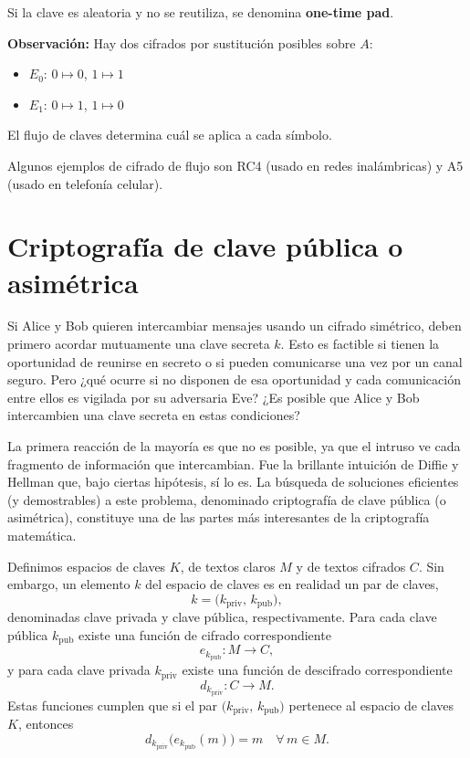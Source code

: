 Si la clave es aleatoria y no se reutiliza, se denomina \textbf{one-time pad}.

\textbf{Observación:} Hay dos cifrados por sustitución posibles sobre $A$:
\begin{itemize}
    \item $E_0$: $0 \mapsto 0$, $1 \mapsto 1$
    \item $E_1$: $0 \mapsto 1$, $1 \mapsto 0$
\end{itemize}

El flujo de claves determina cuál se aplica a cada símbolo.

Algunos ejemplos de cifrado de flujo son RC4 (usado en redes inalámbricas)\cite{rfc6229,gfg-rc4} y A5 (usado en
telefonía celular)\cite{stockinger2005a5,jensen2017a5}.

\section{Criptografía de clave pública o asimétrica}
Si Alice y Bob quieren intercambiar mensajes usando un cifrado simétrico, deben primero acordar mutuamente una clave secreta \(k\). Esto es factible si tienen la oportunidad de reunirse en secreto o si pueden comunicarse una vez por un canal seguro. Pero ¿qué ocurre si no disponen de esa oportunidad y cada comunicación entre ellos es vigilada por su adversaria Eve? ¿Es posible que Alice y Bob intercambien una clave secreta en estas condiciones?

La primera reacción de la mayoría es que no es posible, ya que el intruso ve cada fragmento de información que intercambian. Fue la brillante intuición de Diffie y Hellman que, bajo ciertas hipótesis, sí lo es. La búsqueda de soluciones eficientes (y demostrables) a este problema, denominado criptografía de clave pública (o asimétrica), constituye una de las partes más interesantes de la criptografía matemática.

Definimos espacios de claves \(K\), de textos claros \(M\) y de textos cifrados \(C\). Sin embargo, un elemento \(k\) del espacio de claves es en realidad un par de claves,
\[
k = \bigl(k_{\text{priv}},\,k_{\text{pub}}\bigr),
\]
denominadas clave privada y clave pública, respectivamente. Para cada clave pública \(k_{\text{pub}}\) existe una función de cifrado correspondiente
\[
e_{k_{\text{pub}}}: M \longrightarrow C,
\]
y para cada clave privada \(k_{\text{priv}}\) existe una función de descifrado correspondiente
\[
d_{k_{\text{priv}}}: C \longrightarrow M.
\]
Estas funciones cumplen que si el par \(\bigl(k_{\text{priv}},\,k_{\text{pub}}\bigr)\) pertenece al espacio de claves \(K\), entonces
\[
d_{k_{\text{priv}}}\bigl(e_{k_{\text{pub}}}(m)\bigr) = m
\quad\forall\,m \in M.
\]

